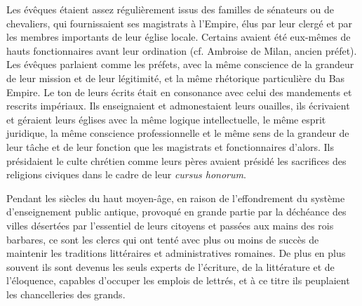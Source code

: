  Les évêques étaient assez régulièrement issus des familles de sénateurs ou de chevaliers, qui fournissaient ses magistrats à l'Empire, élus par leur clergé et par les membres importants de leur église locale. Certains avaient été eux-mêmes de hauts fonctionnaires avant leur ordination (cf. Ambroise de Milan, ancien préfet). Les évêques parlaient comme les préfets, avec la même conscience de la grandeur de leur mission et de leur légitimité, et la même rhétorique particulière du Bas Empire. Le ton de leurs écrits était en consonance avec celui des mandements et rescrits impériaux. Ils enseignaient et admonestaient leurs ouailles, ils écrivaient et géraient leurs églises avec la même logique intellectuelle, le même esprit juridique, la même conscience professionnelle et le même sens de la grandeur de leur tâche et de leur fonction que les magistrats et fonctionnaires d'alors. Ils présidaient le culte chrétien comme leurs pères avaient présidé les sacrifices des religions civiques dans le cadre de leur \emph{cursus honorum}. 

 Pendant les siècles du haut moyen-âge, en raison de l'effondrement du système d'enseignement public antique, provoqué en grande partie par la déchéance des villes désertées par l'essentiel de leurs citoyens et passées aux mains des rois barbares, ce sont les clercs qui ont tenté avec plus ou moins de succès de maintenir les traditions littéraires et administratives romaines. De plus en plus souvent ils sont devenus les seuls experts de l'écriture, de la littérature et de l'éloquence, capables d'occuper les emplois de lettrés, et à ce titre ils peuplaient les chancelleries des grands.

